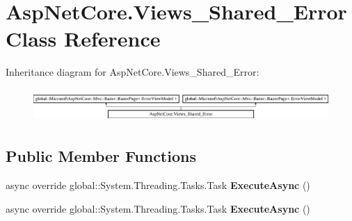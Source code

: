 \hypertarget{class_asp_net_core_1_1_views___shared___error}{}\section{Asp\+Net\+Core.\+Views\+\_\+\+Shared\+\_\+\+Error Class Reference}
\label{class_asp_net_core_1_1_views___shared___error}
Inheritance diagram for Asp\+Net\+Core.\+Views\+\_\+\+Shared\+\_\+\+Error\+:\begin{figure}[H]
\begin{center}
\leavevmode
\includegraphics[height=1.281464cm]{class_asp_net_core_1_1_views___shared___error}
\end{center}
\end{figure}
\subsection*{Public Member Functions}
\begin{DoxyCompactItemize}
\item 
\mbox{\label{class_asp_net_core_1_1_views___shared___error_a3cdb89b5008b1f7058bd2493983c0356}} 
async override global\+::\+System.\+Threading.\+Tasks.\+Task {\bfseries Execute\+Async} ()
\item 
\mbox{\label{class_asp_net_core_1_1_views___shared___error_a3cdb89b5008b1f7058bd2493983c0356}} 
async override global\+::\+System.\+Threading.\+Tasks.\+Task {\bfseries Execute\+Async} ()
\end{DoxyCompactItemize}
